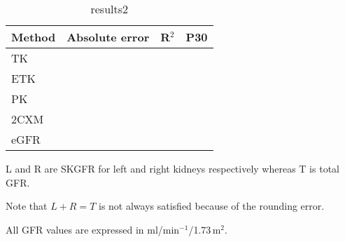 \begin{table}
\centering
\caption{results2}
\label{tab:results2}
\begin{threeparttable}
\renewcommand{\arraystretch}{1.5}
\begin{tabular}{L{3cm} R{3cm} R{3cm} R{3cm}}
	\toprule

	{\textbf{Method}} & \textbf{Absolute error}  & \textbf{R$^2$} & \textbf{P30} \\ \toprule
				 TK   & 		      			 &				  &              \\
				ETK   & 		      			 &				  & \\
				 PK   & 		      			 &				  &\\
			    2CXM  & 		      			 &				  &\\
				eGFR  & 		      			 & 				  &\\

  	\bottomrule

\end{tabular}
\begin{tablenotes}%
\footnotesize{}%
\item L and R are SKGFR for left and right kidneys respectively whereas T is total GFR.
\item Note that $L+R = T$ is not always satisfied because of the rounding error.
\item All GFR values are expressed in ml/min$^{-1}$/1.73\,m$^2$.
    \end{tablenotes}
	\end{threeparttable}
\end{table}
